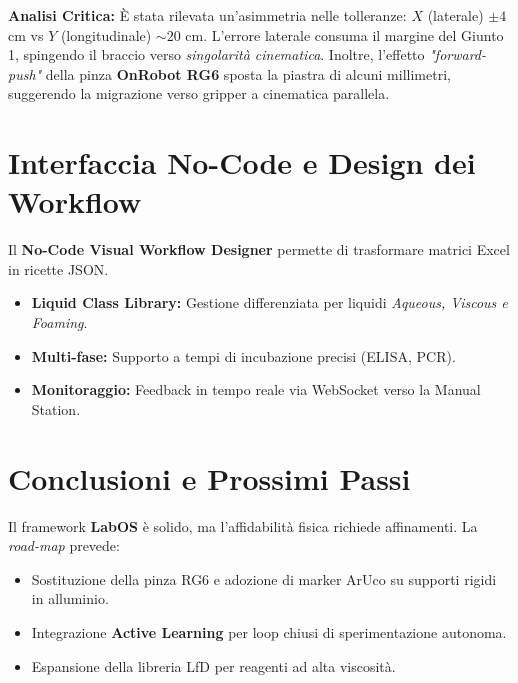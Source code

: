 \documentclass[a4paper,11pt]{article}
\begin{document}
	\textbf{Analisi Critica:} È stata rilevata un'asimmetria nelle tolleranze: $X$ (laterale) $\pm 4$ cm vs $Y$ (longitudinale) $\sim 20$ cm. L'errore laterale consuma il margine del Giunto 1, spingendo il braccio verso \textit{singolarità cinematica}. Inoltre, l'effetto \textit{"forward-push"} della pinza \textbf{OnRobot RG6} sposta la piastra di alcuni millimetri, suggerendo la migrazione verso gripper a cinematica parallela.
	
	\section{Interfaccia No-Code e Design dei Workflow}
	Il \textbf{No-Code Visual Workflow Designer} permette di trasformare matrici Excel in ricette JSON.
	\begin{itemize}
		\item \textbf{Liquid Class Library:} Gestione differenziata per liquidi \textit{Aqueous, Viscous e Foaming}.
		\item \textbf{Multi-fase:} Supporto a tempi di incubazione precisi (ELISA, PCR).
		\item \textbf{Monitoraggio:} Feedback in tempo reale via WebSocket verso la Manual Station.
	\end{itemize}
	
	\section{Conclusioni e Prossimi Passi}
	Il framework \textbf{LabOS} è solido, ma l'affidabilità fisica richiede affinamenti. La \textit{road-map} prevede:
	\begin{itemize}
		\item Sostituzione della pinza RG6 e adozione di marker ArUco su supporti rigidi in alluminio.
		\item Integrazione \textbf{Active Learning} per loop chiusi di sperimentazione autonoma.
		\item Espansione della libreria LfD per reagenti ad alta viscosità.
	\end{itemize}
	
\end{document}
